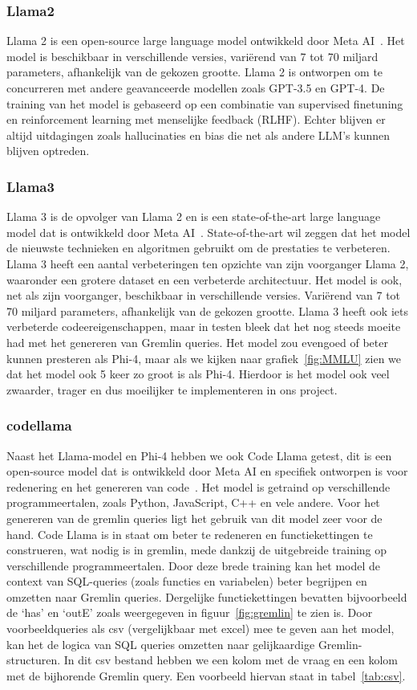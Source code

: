 \subsubsection{Llama2}
Llama 2 is een open-source large language model ontwikkeld door Meta AI~\autocite{llama2}. 
Het model is beschikbaar in verschillende versies, variërend van 7 tot 70 miljard parameters, afhankelijk van de gekozen grootte.
Llama 2 is ontworpen om te concurreren met andere geavanceerde modellen zoals GPT-3.5 en GPT-4.
De training van het model is gebaseerd op een combinatie van supervised finetuning en reinforcement learning met menselijke feedback (RLHF).
Echter blijven er altijd uitdagingen zoals hallucinaties en bias die net als andere LLM's kunnen blijven optreden.

\subsubsection{Llama3}
Llama 3 is de opvolger van Llama 2 en is een state-of-the-art large language model dat is ontwikkeld door Meta AI~\autocite{Meta2024}.
State-of-the-art wil zeggen dat het model de nieuwste technieken en algoritmen gebruikt om de prestaties te verbeteren.
Llama 3 heeft een aantal verbeteringen ten opzichte van zijn voorganger Llama 2, waaronder een grotere dataset en een verbeterde architectuur.
Het model is ook, net als zijn voorganger, beschikbaar in verschillende versies. Variërend van 7 tot 70 miljard parameters, afhankelijk van de gekozen grootte.
Llama 3 heeft ook iets verbeterde codeereigenschappen, maar in testen bleek dat het nog steeds moeite had met het genereren van Gremlin queries.
Het model zou evengoed of beter kunnen presteren als Phi-4, maar als we kijken naar grafiek~\ref{fig:MMLU} zien we dat het model ook 5 keer zo groot is als Phi-4.
Hierdoor is het model ook veel zwaarder, trager en dus moeilijker te implementeren in ons project. 

\subsubsection{codellama}
Naast het Llama-model en Phi-4 hebben we ook Code Llama getest, dit is een open-source model dat is ontwikkeld door Meta AI en specifiek ontworpen is voor redenering en het genereren van code~\autocite{codellama}.
Het model is getraind op verschillende programmeertalen, zoals Python, JavaScript, C++ en vele andere. Voor het genereren van de gremlin queries ligt het gebruik van dit model zeer voor de hand.
Code Llama is in staat om beter te redeneren en functiekettingen te construeren, wat nodig is in gremlin, mede dankzij de uitgebreide training op verschillende programmeertalen.\@
Door deze brede training kan het model de context van SQL-queries (zoals functies en variabelen) beter begrijpen en omzetten naar Gremlin queries.
Dergelijke functiekettingen bevatten bijvoorbeeld de `has' en `outE' zoals weergegeven in figuur~\ref{fig:gremlin} te zien is.
Door voorbeeldqueries als csv (vergelijkbaar met excel) mee te geven aan het model, kan het de logica van SQL queries omzetten naar gelijkaardige Gremlin-structuren.
In dit csv bestand hebben we een kolom met de vraag en een kolom met de bijhorende Gremlin query.
Een voorbeeld hiervan staat in tabel~\ref{tab:csv}.

